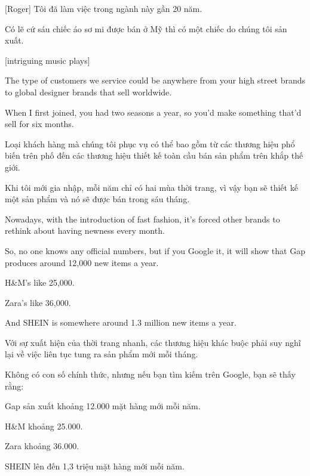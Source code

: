 \documentclass[a4paper]{article}
\begin{document}
	\begin{vietnamese-v2}
		
		[Roger] Tôi đã làm việc trong ngành này gần 20 năm.  
		
		Có lẽ cứ sáu chiếc áo sơ mi được bán ở Mỹ thì có một chiếc do chúng tôi sản xuất.  
	\end{vietnamese-v2}
	
	[intriguing music plays]
	
	The type of customers we service could be anywhere from your high street brands to global designer brands that sell worldwide.
	
	When I first joined, you had two seasons a year, so you'd make something that'd sell for six months.
	
	\begin{vietnamese-v2}
		
		Loại khách hàng mà chúng tôi phục vụ có thể bao gồm từ các thương hiệu phổ biến trên phố đến các thương hiệu thiết kế toàn cầu bán sản phẩm trên khắp thế giới.  
		
		Khi tôi mới gia nhập, mỗi năm chỉ có hai mùa thời trang, vì vậy bạn sẽ thiết kế một sản phẩm và nó sẽ được bán trong sáu tháng.  
	\end{vietnamese-v2}
	
	Nowadays, with the introduction of fast fashion, it's forced other brands to rethink about having newness every month.
	
	So, no one knows any official numbers, but if you Google it, it will show that Gap produces around 12,000 new items a year.
	
	H\&M's like 25,000.
	
	Zara's like 36,000.
	
	And SHEIN is somewhere around 1.3 million new items a year.
	
	\begin{vietnamese-v2}
		Với sự xuất hiện của thời trang nhanh, các thương hiệu khác buộc phải suy nghĩ lại về việc liên tục tung ra sản phẩm mới mỗi tháng.  
		
		Không có con số chính thức, nhưng nếu bạn tìm kiếm trên Google, bạn sẽ thấy rằng:  
		
		Gap sản xuất khoảng 12.000 mặt hàng mới mỗi năm.  
		
		H\&M khoảng 25.000.  
		
		Zara khoảng 36.000.  
		
		SHEIN lên đến 1,3 triệu mặt hàng mới mỗi năm.  
	\end{vietnamese-v2}
	
\end{document}
